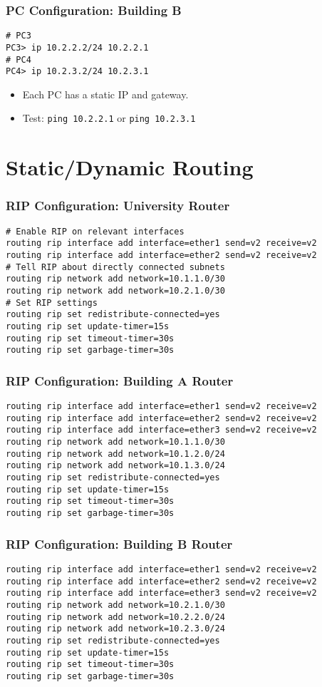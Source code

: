 \documentclass{beamer}
\begin{document}
\begin{frame}[fragile]
\frametitle{PC Configuration: Building B}
\begin{lstlisting}
# PC3
PC3> ip 10.2.2.2/24 10.2.2.1
# PC4
PC4> ip 10.2.3.2/24 10.2.3.1
\end{lstlisting}
\begin{itemize}
    \item Each PC has a static IP and gateway.
    \item Test: \texttt{ping 10.2.2.1} or \texttt{ping 10.2.3.1}
\end{itemize}
\end{frame}

\section{Static/Dynamic Routing}

\begin{frame}[fragile,label=routing]
\frametitle{RIP Configuration: University Router}
\begin{lstlisting}
# Enable RIP on relevant interfaces
routing rip interface add interface=ether1 send=v2 receive=v2
routing rip interface add interface=ether2 send=v2 receive=v2
# Tell RIP about directly connected subnets
routing rip network add network=10.1.1.0/30
routing rip network add network=10.2.1.0/30
# Set RIP settings
routing rip set redistribute-connected=yes
routing rip set update-timer=15s
routing rip set timeout-timer=30s
routing rip set garbage-timer=30s
\end{lstlisting}
\end{frame}

\begin{frame}[fragile]
\frametitle{RIP Configuration: Building A Router}
\begin{lstlisting}
routing rip interface add interface=ether1 send=v2 receive=v2
routing rip interface add interface=ether2 send=v2 receive=v2
routing rip interface add interface=ether3 send=v2 receive=v2
routing rip network add network=10.1.1.0/30
routing rip network add network=10.1.2.0/24
routing rip network add network=10.1.3.0/24
routing rip set redistribute-connected=yes
routing rip set update-timer=15s
routing rip set timeout-timer=30s
routing rip set garbage-timer=30s
\end{lstlisting}


\end{frame}

\begin{frame}[fragile]
\frametitle{RIP Configuration: Building B Router}
\begin{lstlisting}
routing rip interface add interface=ether1 send=v2 receive=v2
routing rip interface add interface=ether2 send=v2 receive=v2
routing rip interface add interface=ether3 send=v2 receive=v2
routing rip network add network=10.2.1.0/30
routing rip network add network=10.2.2.0/24
routing rip network add network=10.2.3.0/24
routing rip set redistribute-connected=yes
routing rip set update-timer=15s
routing rip set timeout-timer=30s
routing rip set garbage-timer=30s
\end{lstlisting}
\end{frame}
\end{document}
